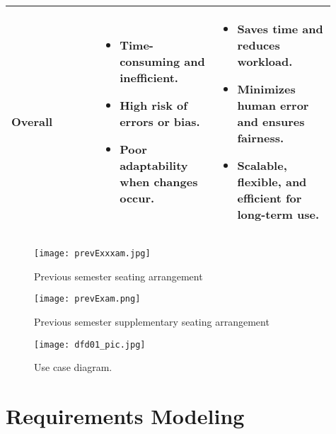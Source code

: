 \documentclass[12pt]{article}
\begin{document}
\begin{longtable}{|>{\bfseries}m{0.25\linewidth}|m{0.33\linewidth}|m{0.33\linewidth}|}
Overall &
\begin{itemize}
    \item Time-consuming and inefficient.  
    \item High risk of errors or bias.  
    \item Poor adaptability when changes occur.  
\end{itemize} &
\begin{itemize}
    \item Saves time and reduces workload.  
    \item Minimizes human error and ensures fairness.  
    \item Scalable, flexible, and efficient for long-term use.  
\end{itemize} \\
\hline
\end{longtable}

\begin{figure}
    \centering
    \texttt{[image: prevExxxam.jpg]}
    \caption{Previous semester seating arrangement}
    \label{fig:placeholder}
\end{figure}
\begin{figure}
    \centering
    \texttt{[image: prevExam.png]}
    \caption{Previous semester supplementary seating arrangement}
    \label{fig:placeholder}
\end{figure}


\newpage













\begin{figure}
    \centering
    \texttt{[image: dfd01\_pic.jpg]}
    \caption{Use case diagram.}
    \label{fig:placeholder}
\end{figure}
\newpage

\section{Requirements Modeling}
\end{document}

